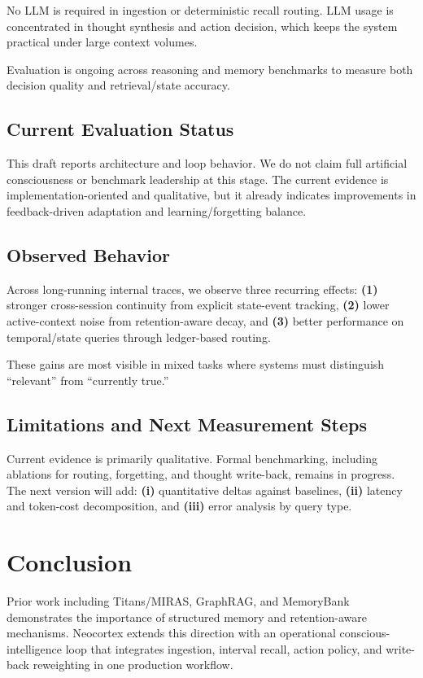 \documentclass{article}
\begin{document}
No LLM is required in ingestion or deterministic recall routing. LLM usage is
concentrated in thought synthesis and action decision, which keeps the system
practical under large context volumes.

Evaluation is ongoing across reasoning and memory benchmarks to measure both
decision quality and retrieval/state accuracy.

\subsection{Current Evaluation Status}

This draft reports architecture and loop behavior. We do not claim full
artificial consciousness or benchmark leadership at this stage. The current
evidence is implementation-oriented and qualitative, but it already indicates
improvements in feedback-driven adaptation and learning/forgetting balance.

\subsection{Observed Behavior}

Across long-running internal traces, we observe three recurring effects:
\textbf{(1)} stronger cross-session continuity from explicit state-event
tracking,
\textbf{(2)} lower active-context noise from retention-aware decay, and
\textbf{(3)} better performance on temporal/state queries through ledger-based
routing.

These gains are most visible in mixed tasks where systems must distinguish
``relevant'' from ``currently true.''

\subsection{Limitations and Next Measurement Steps}

Current evidence is primarily qualitative. Formal benchmarking, including
ablations for routing, forgetting, and thought write-back, remains in
progress. The next version will add:
\textbf{(i)} quantitative deltas against baselines,
\textbf{(ii)} latency and token-cost decomposition, and
\textbf{(iii)} error analysis by query type.


\section{Conclusion}

Prior work including Titans/MIRAS, GraphRAG, and MemoryBank demonstrates the
importance of structured memory and retention-aware mechanisms. Neocortex
extends this direction with an operational conscious-intelligence loop that
integrates ingestion, interval recall, action policy, and write-back
reweighting in one production workflow.
\end{document}
